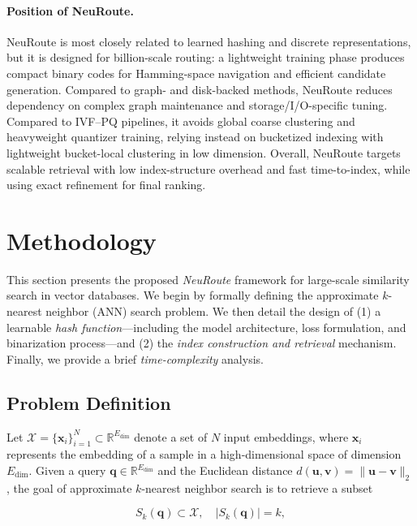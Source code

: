 \documentclass[sigconf, nonacm]{acmart}
\begin{document}
\paragraph{Position of NeuRoute.}
NeuRoute is most closely related to learned hashing and discrete representations, but it is designed for billion-scale routing: a lightweight training phase produces compact binary codes for Hamming-space navigation and efficient candidate generation. Compared to graph- and disk-backed methods, NeuRoute reduces dependency on complex graph maintenance and storage/I/O-specific tuning. Compared to IVF–PQ pipelines, it avoids global coarse clustering and heavyweight quantizer training, relying instead on bucketized indexing with  lightweight bucket-local clustering in low dimension. Overall, NeuRoute targets scalable retrieval with low index-structure overhead and fast time-to-index, while using exact refinement for final ranking.


\section{Methodology} \label{sec:Methodology}

This section presents the proposed \textit{NeuRoute} framework for large-scale similarity search in vector databases. We begin by formally defining the approximate $k$-nearest neighbor (ANN) search problem. We then detail the design of (1) a learnable \emph{hash function}—including the model architecture, loss formulation, and binarization process—and (2) the \emph{index construction and retrieval} mechanism. Finally, we provide a brief \emph{time-complexity} analysis.

\subsection{Problem Definition}

Let $\mathcal{X} = \{\mathbf{x}_i\}_{i=1}^N \subset \mathbb{R}^{E_{\text{dim}}}$ denote a set of $N$ input embeddings, where $\mathbf{x}_i$ represents the embedding of a sample in a high-dimensional space of dimension $E_{\text{dim}}$. Given a query $\mathbf{q} \in \mathbb{R}^{E_{\text{dim}}}$ and the Euclidean distance
$d(\mathbf{u},\mathbf{v})=\|\mathbf{u}-\mathbf{v}\|_2$,
the goal of approximate $k$-nearest neighbor search is to retrieve a subset

\begin{equation}
 S_k(\mathbf{q}) \subset \mathcal{X}, \quad |S_k(\mathbf{q})| = k,   
\end{equation}
\end{document}
